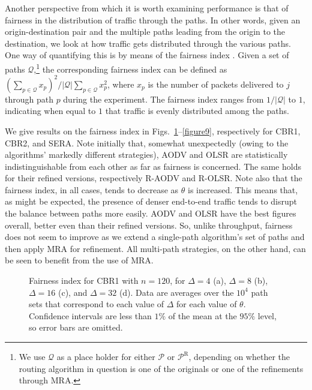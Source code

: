 \documentclass{article}
\begin{document}
Another perspective from which it is worth examining performance is that of
fairness in the distribution of traffic through the paths. In other words, given
an origin-destination pair and the multiple paths leading from the origin to the
destination, we look at how traffic gets distributed through the various paths.
One way of quantifying this is by means of the fairness index \cite{Jain1998}.
Given a set of paths $\mathcal{Q}$,\footnote{We use $\mathcal{Q}$ as a place
holder for either $\mathcal{P}$ or $\mathcal{P}^\mathrm{R}$, depending on
whether the routing algorithm in question is one of the originals or one of the
refinements through MRA.} the corresponding fairness index can be defined as
$(\sum_{p\in\mathcal{Q}}x_p)^2/\vert\mathcal{Q}\vert\sum_{p\in\mathcal{Q}}x_p^2$,
where $x_p$ is the number of packets delivered to $j$ through path $p$ during
the experiment. The fairness index ranges from $1/\vert\mathcal{Q}\vert$ to $1$,
indicating when equal to $1$ that traffic is evenly distributed among the paths.

We give results on the fairness index in Figs.~\ref{figure7}--\ref{figure9},
respectively for CBR1, CBR2, and SERA. Note initially that, somewhat
unexpectedly (owing to the algorithms' markedly different strategies), AODV and
OLSR are statistically indistinguishable from each other as far as fairness is
concerned. The same holds for their refined versions, respectively R-AODV and
R-OLSR. Note also that the fairness index, in all cases, tends to decrease as
$\theta$ is increased. This means that, as might be expected, the presence of
denser end-to-end traffic tends to disrupt the balance between paths more
easily. AODV and OLSR have the best figures overall, better even than their
refined versions. So, unlike throughput, fairness does not seem to improve as we
extend a single-path algorithm's set of paths and then apply MRA for refinement.
All multi-path strategies, on the other hand, can be seen to benefit from the
use of MRA.

\begin{figure}[p]
\centering
{}
\caption{Fairness index for CBR1 with $n=120$, for $\Delta=4$ (a), $\Delta=8$
(b), $\Delta=16$ (c), and $\Delta=32$ (d). Data are averages over the $10^4$
path sets that correspond to each value of $\Delta$ for each value of $\theta$.
Confidence intervals are less than $1\%$ of the mean at the $95\%$ level, so
error bars are omitted.}
\label{figure7}
\end{figure}
\end{document}
